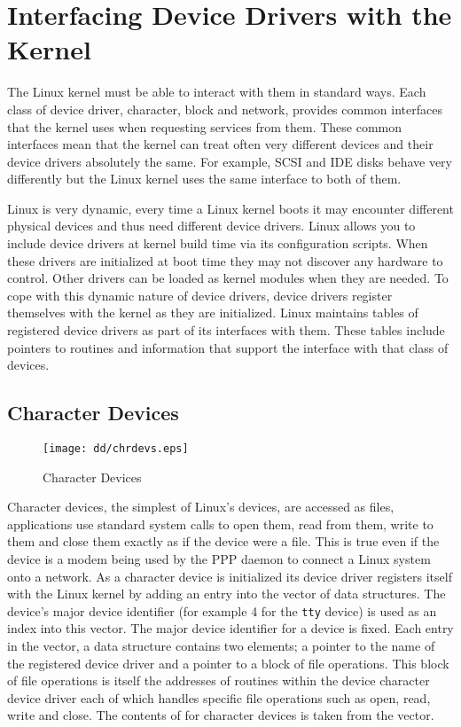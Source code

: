 \section{Interfacing Device Drivers with the Kernel}
The Linux kernel must be able to interact with them in standard ways.
Each class of device driver, character, block and network, provides common
interfaces that the kernel uses when requesting services from them.
These common interfaces mean that the kernel can treat often very different
devices and their device drivers absolutely the same.
For example, SCSI and IDE disks behave very differently but the Linux kernel
uses the same interface to both of them.

Linux is very dynamic, every time a Linux kernel boots it may encounter
different physical devices and thus need different device drivers.
Linux allows you to include device drivers at kernel build time via its
configuration scripts.
When these drivers are initialized at boot time they may not discover any
hardware to control.
Other drivers can be loaded as kernel modules when they are needed.
To cope with this dynamic nature of device drivers, device drivers 
register themselves with the kernel as they are initialized.
Linux maintains tables of registered device drivers as part of its interfaces
with them.
These tables include pointers to routines and information that support
the interface with that class of devices.

\subsection{Character Devices}
\begin{figure}
\begin{center}
{\centering \texttt{[image: dd/chrdevs.eps]} \par}
\end{center}
\caption{Character Devices}
\label{chrdevs-figure}
\end{figure}
Character devices, the simplest of Linux's devices, are accessed as files, 
applications use standard system calls to open them, read from them, write
to them and close them exactly as if the device were a file.
This is true even if the device is a modem being used by the PPP daemon
to connect a Linux system onto a network.
As a character device is initialized its device driver registers itself with
the Linux kernel by adding an entry into the 
vector of  data structures.
The device's major device identifier (for example 4 for the \texttt{tty} 
device) is used as an index into this vector.
The major device identifier for a device is fixed.
Each entry in the  vector, a 
 data structure contains two elements; a pointer to the
name of the registered device driver and a pointer to a block of file
operations.
This block of file operations is itself the addresses of routines within the
device character device driver each of which handles  specific file operations
such as open, read, write and close.
The contents of  for character devices is taken from
the  vector.

